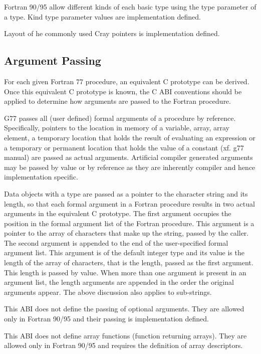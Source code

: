 Fortran 90/95 allow different kinds of each basic type using the 
type parameter of a type.  Kind type parameter values are
implementation defined.

Layout of he commonly used Cray pointers is implementation defined.

\subsection{Argument Passing}

For each given Fortran 77 procedure, an equivalent C prototype can
be derived. Once this equivalent C prototype is known, the C ABI
conventions should be applied to determine how arguments are passed
to the Fortran procedure.

G77 passes all (user defined) formal arguments of a procedure by
reference.  Specifically, pointers to the location in memory of a
variable, array, array element, a temporary location that holds the
result of evaluating an expression or a temporary or permanent
location that holds the value of a constant (xf. g77 manual) are
passed as actual arguments. Artificial compiler generated arguments
may be passed by value or by reference as they are inherently
compiler and hence implementation specific.

Data objects with a  type are passed as a pointer to
the character string and its length, so that each 
formal argument in a Fortran procedure results in two actual arguments
in the equivalent C prototype.  The first argument occupies the
position in the formal argument list of the Fortran procedure.  This
argument is a pointer to the array of characters that make up the
string, passed by the caller.  The second argument is appended to the
end of the user-specified formal argument list.  This argument is of
the default integer type and its value is the length of the array of
characters, that is the length, passed as the first argument.  This
length is passed by value.
When more than one  argument is present in an argument
list, the length arguments are appended in the order the original
arguments appear.  The above discussion also applies to sub-strings.

This ABI does not define the passing of optional arguments.  They are
allowed only in Fortran 90/95 and their passing is implementation defined.

This ABI does not define array functions (function returning arrays).
They are allowed only in Fortran 90/95 and requires the definition of
array descriptors.

